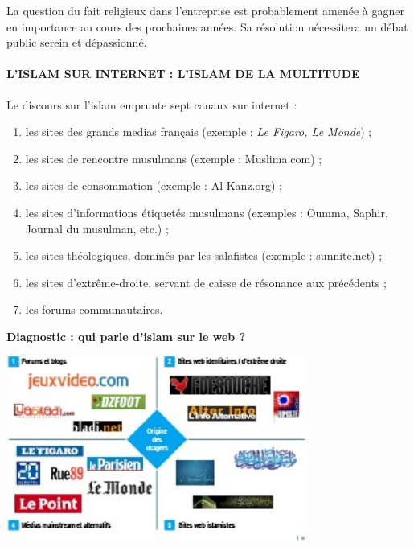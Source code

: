 La question du fait religieux dans l'entreprise est probablement amenée
à gagner en importance au cours des prochaines années. Sa résolution
nécessitera un débat public serein et dépassionné.




\hypertarget{lislam-sur-internet-lislam-de-la-multitude}{%
\paragraph{L'ISLAM SUR INTERNET : L'ISLAM DE LA
MULTITUDE}\label{lislam-sur-internet-lislam-de-la-multitude}}


Le discours sur l'islam emprunte sept canaux sur internet :


\begin{enumerate}
\def\labelenumi{\alph{enumi}.}
\item
  les sites des grands medias français (exemple : \emph{Le Figaro, Le
  Monde}) ;
\item
  
  les sites de rencontre musulmans (exemple : Muslima.com) ;
  
\item
  
  les sites de consommation (exemple : Al-Kanz.org) ;
  
\item
  
  les sites d'informations étiquetés musulmans (exemples : Oumma,
  Saphir, Journal du musulman, etc.) ;
  
\item
  
  les sites théologiques, dominés par les salafistes (exemple :
  sunnite.net) ;
  
\item
  
  les sites d'extrême-droite, servant de caisse de résonance aux
  précédents ;
  
\item
  
  les forums communautaires.
  
\end{enumerate}


\textbf{Diagnostic : qui parle d'islam sur le web ?}


\includegraphics[width=3.88942in,height=2.3925in]{ImageIslamFrance/media/image10.jpeg}

